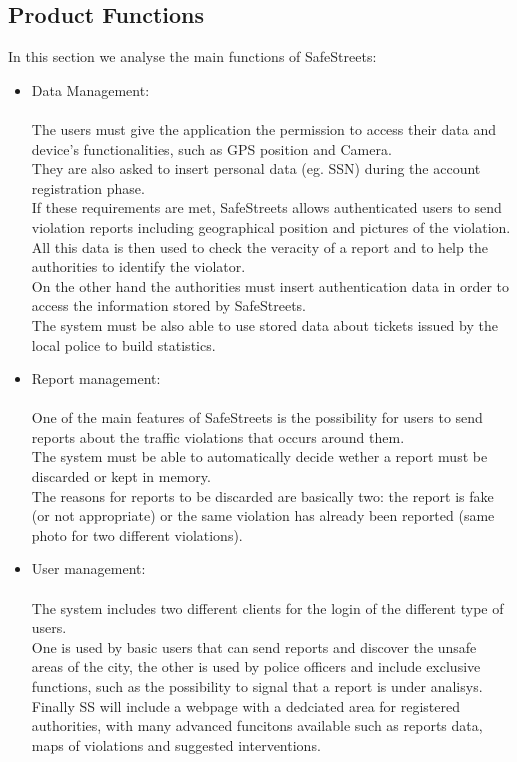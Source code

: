 \subsection{Product Functions}
In this section we analyse the main functions of SafeStreets: 
\begin{itemize}
	\item Data Management: \\ \\
	The users must give the application the permission to access their data and device’s functionalities, such as GPS position and Camera. \\
	They are also asked to insert personal data (eg. SSN) during the account registration phase. \\
	If these requirements are met, SafeStreets allows authenticated users to send violation reports including geographical position and pictures of the violation. \\
	All this data is then used to check the veracity of a report and to help the authorities to identify the violator. \\
	On the other hand the authorities must insert authentication data in order to access the information stored by SafeStreets. \\
	The system must be also able to use stored data about tickets issued by the local police to build statistics.
	
	\item Report management: \\ \\
	One of the main features of SafeStreets is the possibility for users to send reports about the traffic violations that occurs around them. \\
	The system must be able to automatically decide wether a report must be discarded or kept in memory. \\
	The reasons for reports to be discarded are basically two: the report is fake (or not appropriate) or the same violation has already been reported (same photo for two different violations). 
	
	\item User management: \\ \\
	The system includes two different clients for the login of the different type of users. \\
	One is used by basic users that can send reports and discover the unsafe areas of the city, the other is used by police officers and include exclusive functions, such as the possibility to signal that a report is under analisys. \\
	Finally SS will include a webpage with a dedciated area for registered authorities, with many advanced funcitons available such as  reports data, maps of violations and suggested interventions. \\
	

\end{itemize}
